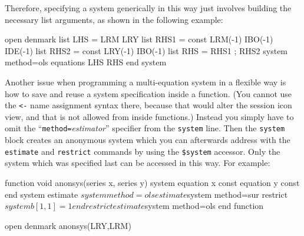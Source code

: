 Therefore, specifying a system generically in this way just involves 
building the necessary list arguments, as shown in the following
example:

\begin{code}
open denmark
list LHS = LRM LRY
list RHS1 = const LRM(-1) IBO(-1) IDE(-1)
list RHS2 = const LRY(-1) IBO(-1)
list RHS = RHS1 ; RHS2
system method=ols
     equations LHS RHS
end system
\end{code}

Another issue when programming a multi-equation system in a flexible
way is how to save and reuse a system specification inside a function.
(You cannot use the \verb|<-| name assignment syntax there, because
that would alter the session icon view, and that is not allowed from
inside functions.) Instead you simply have to omit the
``\texttt{method=}\textsl{estimator}'' specifier from the
\texttt{system} line. Then the \texttt{system} block creates an
anonymous system which you can afterwards address with the
\texttt{estimate} and \texttt{restrict} commands by using the
\verb|$system| accessor. Only the system which was specified last can
be accessed in this way. For example:

\begin{code}
function void anonsys(series x, series y)
     system
         equation x const
         equation y const
     end system
     estimate $system method=ols
     estimate $system method=sur
     restrict $system
         b[1,1]=1
     end restrict
     estimate $system method=ols
end function

open denmark
anonsys(LRY,LRM)
\end{code}


